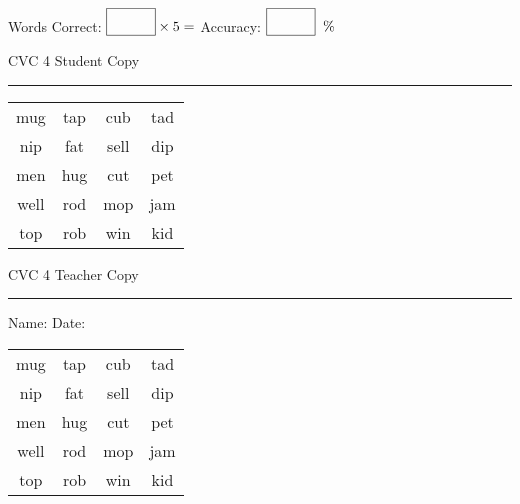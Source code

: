 \documentclass{memoir}
\begin{document}
\small

Words Correct: $\fbox{\phantom{\huge 100}} \times 5 = $ Accuracy: $\fbox{\phantom{\huge 100}}\;\; \%$ 

\vfill

\newpage


\footnotesize \noindent
CVC 4 \hfill Student Copy
\smallskip
\hrule

\Large

\setlength{\tabcolsep}{14pt}
\def\arraystretch{2}

{\selectfont


\begin{vplace}[0.5]
\begin{center}
\begin{tabular}{cccc}
mug & tap & cub & tad \\
nip & fat & sell & dip \\
men & hug & cut & pet \\
well & rod & mop & jam \\
top & rob & win & kid \\
\end{tabular}
\end{center}
\end{vplace}

}

\newpage

\footnotesize \noindent
CVC 4 \hfill Teacher Copy
\smallskip
\hrule

\small

\vfill

\noindent
Name: \underline{\hspace{1.75in}} \hfill Date: \underline{\hspace{1in}}

\Large

{\selectfont


\begin{vplace}[0.5]
\begin{center}
\begin{tabular}{cccc}
mug & tap & cub & tad \\
nip & fat & sell & dip \\
men & hug & cut & pet \\
well & rod & mop & jam \\
top & rob & win & kid \\
\end{tabular}
\end{center}
\end{vplace}



}
\end{document}
